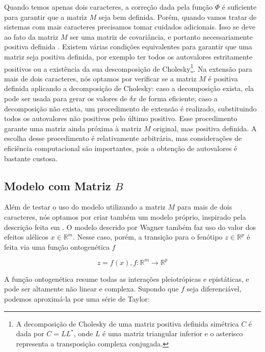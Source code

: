 Quando temos apenas dois caracteres, a correção dada pela função $\Phi$ é
suficiente para garantir que a matriz $M$ seja bem definida.
Porém, quando vamos tratar de sistemas com mais caracteres precisamos
tomar cuidados adicionais.
Isso se deve ao fato da matriz $M$ ser uma matriz de covariância, e
portanto necessariamente positiva definida \citep{Anderson1984}.
Existem várias condições equivalentes para garantir que uma matriz seja
positiva definida, por exemplo ter todos os autovalores estritamente
positivos ou a existência da sua descomposição de Cholesky\footnote{A
decomposição de Cholesky de uma matriz positiva definida simétrica
$C$ é dada por $C=LL^*$, onde $L$ é uma matriz triangular inferior e o asterisco
representa a transposição complexa conjugada.}.
Na extensão para mais de dois caracteres, nós optamos por verificar se a
matriz $M$ é positiva definida aplicando a decomposição de Cholesky:
caso a decomposição exista, ela pode ser usada para gerar os valores
de $\delta x$ de forma eficiente; caso a decomposição não exista, um
procedimento de extensão \citep{Marroig2011b} é realizado,
substituindo todos os autovalores não positivos pelo último positivo.
Esse procedimento garante uma matriz ainda próxima à matriz $M$
original, mas positiva definida.
A escolha desse procedimento é relativamente arbitrária, mas
considerações de eficiência computacional são importantes, pois a
obtenção de autovalores é bastante custosa.

\subsection{Modelo com Matriz $B$}\label{cap2:mem:ModelB}

Além de testar o uso do modelo utilizando a matriz $M$ para mais de dois
caracteres, nós optamos por criar também um modelo próprio, inspirado pela
descrição feita em \cite{Wagner1984}.
O modelo descrido por Wagner também faz uso do valor dos efeitos
alélicos $x \in \mathbb{R}^m$.
Nesse caso, porém, a transição para o fenótipo $z \in \mathbb{R}^p$ é
feita via uma função ontogenética $f$

\begin{equation}
z = f(x), f:\mathbb{R}^m \rightarrow \mathbb{R}^{p}
\end{equation}

A função ontogenética resume todas as interações pleiotrópicas e
epistáticas, e pode ser altamente não linear e complexa.
Supondo que $f$ seja diferenciável, podemos aproximá-la por uma série de
Taylor:

